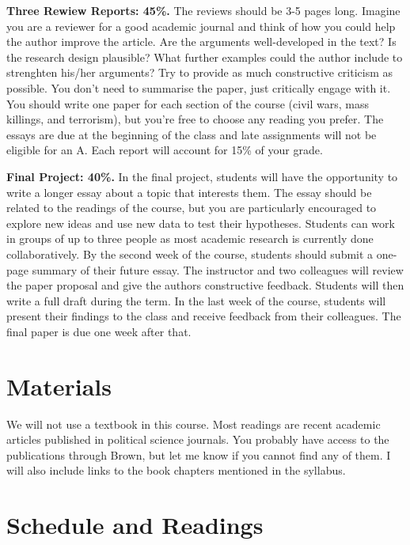 \documentclass[12pt,]{article}
\begin{document}
\textbf{Three Rewiew Reports: 45\%.} The reviews should be 3-5 pages
long. Imagine you are a reviewer for a good academic journal and think
of how you could help the author improve the article. Are the arguments
well-developed in the text? Is the research design plausible? What
further examples could the author include to strenghten his/her
arguments? Try to provide as much constructive criticism as possible.
You don't need to summarise the paper, just critically engage with it.
You should write one paper for each section of the course (civil wars,
mass killings, and terrorism), but you're free to choose any reading you
prefer. The essays are due at the beginning of the class and late
assignments will not be eligible for an A. Each report will account for
15\% of your grade.

\textbf{Final Project: 40\%.} In the final project, students will have
the opportunity to write a longer essay about a topic that interests
them. The essay should be related to the readings of the course, but you
are particularly encouraged to explore new ideas and use new data to
test their hypotheses. Students can work in groups of up to three people
as most academic research is currently done collaboratively. By the
second week of the course, students should submit a one-page summary of
their future essay. The instructor and two colleagues will review the
paper proposal and give the authors constructive feedback. Students will
then write a full draft during the term. In the last week of the course,
students will present their findings to the class and receive feedback
from their colleagues. The final paper is due one week after that.

\hypertarget{materials}{%
\section{Materials}\label{materials}}

We will not use a textbook in this course. Most readings are recent
academic articles published in political science journals. You probably
have access to the publications through Brown, but let me know if you
cannot find any of them. I will also include links to the book chapters
mentioned in the syllabus.

\hypertarget{schedule-and-readings}{%
\section{Schedule and Readings}\label{schedule-and-readings}}
\end{document}
